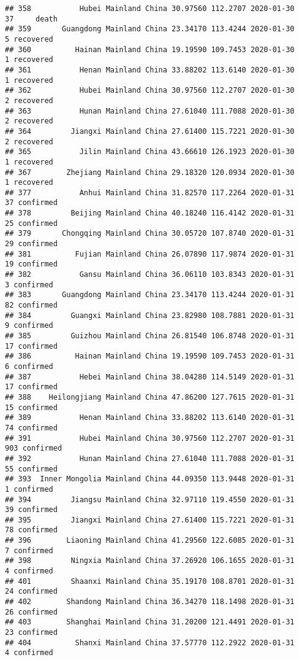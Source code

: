 \documentclass[
]{article}
\begin{document}
\begin{verbatim}
## 358           Hubei Mainland China 30.97560 112.2707 2020-01-30    37     death
## 359       Guangdong Mainland China 23.34170 113.4244 2020-01-30     5 recovered
## 360          Hainan Mainland China 19.19590 109.7453 2020-01-30     1 recovered
## 361           Henan Mainland China 33.88202 113.6140 2020-01-30     1 recovered
## 362           Hubei Mainland China 30.97560 112.2707 2020-01-30     2 recovered
## 363           Hunan Mainland China 27.61040 111.7088 2020-01-30     2 recovered
## 364         Jiangxi Mainland China 27.61400 115.7221 2020-01-30     2 recovered
## 365           Jilin Mainland China 43.66610 126.1923 2020-01-30     1 recovered
## 367        Zhejiang Mainland China 29.18320 120.0934 2020-01-30     1 recovered
## 377           Anhui Mainland China 31.82570 117.2264 2020-01-31    37 confirmed
## 378         Beijing Mainland China 40.18240 116.4142 2020-01-31    25 confirmed
## 379       Chongqing Mainland China 30.05720 107.8740 2020-01-31    29 confirmed
## 381          Fujian Mainland China 26.07890 117.9874 2020-01-31    19 confirmed
## 382           Gansu Mainland China 36.06110 103.8343 2020-01-31     3 confirmed
## 383       Guangdong Mainland China 23.34170 113.4244 2020-01-31    82 confirmed
## 384         Guangxi Mainland China 23.82980 108.7881 2020-01-31     9 confirmed
## 385         Guizhou Mainland China 26.81540 106.8748 2020-01-31    17 confirmed
## 386          Hainan Mainland China 19.19590 109.7453 2020-01-31     6 confirmed
## 387           Hebei Mainland China 38.04280 114.5149 2020-01-31    17 confirmed
## 388    Heilongjiang Mainland China 47.86200 127.7615 2020-01-31    15 confirmed
## 389           Henan Mainland China 33.88202 113.6140 2020-01-31    74 confirmed
## 391           Hubei Mainland China 30.97560 112.2707 2020-01-31   903 confirmed
## 392           Hunan Mainland China 27.61040 111.7088 2020-01-31    55 confirmed
## 393  Inner Mongolia Mainland China 44.09350 113.9448 2020-01-31     1 confirmed
## 394         Jiangsu Mainland China 32.97110 119.4550 2020-01-31    39 confirmed
## 395         Jiangxi Mainland China 27.61400 115.7221 2020-01-31    78 confirmed
## 396        Liaoning Mainland China 41.29560 122.6085 2020-01-31     7 confirmed
## 398         Ningxia Mainland China 37.26920 106.1655 2020-01-31     4 confirmed
## 401         Shaanxi Mainland China 35.19170 108.8701 2020-01-31    24 confirmed
## 402        Shandong Mainland China 36.34270 118.1498 2020-01-31    26 confirmed
## 403        Shanghai Mainland China 31.20200 121.4491 2020-01-31    23 confirmed
## 404          Shanxi Mainland China 37.57770 112.2922 2020-01-31     4 confirmed

\end{verbatim}
\end{document}
